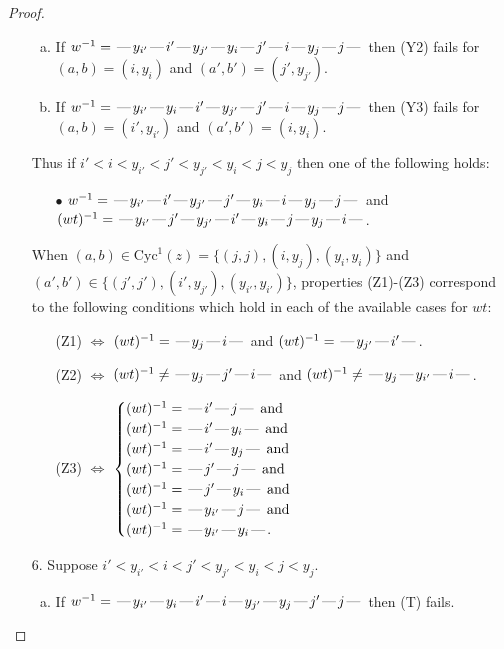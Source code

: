 \documentclass[10pt]{article}
\theoremstyle{definition}
\theoremstyle{definition}
\def\dash{\text{\hspace{0.5mm}---\hspace{0.5mm}}}
\def\Cyc{\mathrm{Cyc}}
\begin{document}
\begin{proof}
\begin{enumerate}
\begin{enumerate}[(a)]
\item If $w^{-1} = \dash y_{i'}\dash i'\dash y_{j'}\dash y_i\dash j'\dash i\dash y_j\dash j\dash $ then (Y2) fails for $(a,b)=(i,y_i)$ and $(a',b')=(j',y_{j'})$.
\item If $w^{-1} = \dash y_{i'}\dash y_i\dash i'\dash y_{j'}\dash j'\dash i\dash y_j\dash j\dash $ then (Y3) fails for $(a,b)=(i',y_{i'})$ and $(a',b')=(i,y_i)$.
\end{enumerate}
Thus if $i' < i < y_{i'} < j' < y_{j'} < y_i < j < y_j$ then one of the following holds:
\begin{enumerate}
\item[$\bullet$] $w^{-1} = \dash y_{i'}\dash i'\dash y_{j'}\dash j'\dash y_i\dash i\dash y_j\dash j\dash $ and $(wt)^{-1} = \dash y_{i'}\dash j'\dash y_{j'}\dash i'\dash y_i\dash j\dash y_j\dash i\dash $.
\end{enumerate}
When $(a,b)\in\Cyc^1(z)=\{(j,j),(i,y_j),(y_i,y_i)\}$ and $(a',b')\in\{(j',j'),(i',y_{j'}),(y_{i'},y_{i'})\}$,
properties (Z1)-(Z3) correspond to the following conditions which
hold in each of the available cases for $wt$:
\begin{enumerate}
\item[](Z1) $\Leftrightarrow$ $(wt)^{-1} = \dash y_j \dash i \dash$  and $(wt)^{-1} = \dash y_{j'} \dash i' \dash$.
\item[](Z2) $\Leftrightarrow$ $(wt)^{-1} \neq \dash y_j \dash j' \dash i \dash$  and $(wt)^{-1} \neq \dash y_j \dash y_{i'} \dash i \dash$.
\item[](Z3) $\Leftrightarrow$ $\begin{cases}\text{$(wt)^{-1} = \dash i' \dash j \dash$}\text{ and }\\
\text{$(wt)^{-1} = \dash i' \dash y_i \dash$}\text{ and }\\
\text{$(wt)^{-1} = \dash i' \dash y_j \dash$}\text{ and }\\
\text{$(wt)^{-1} = \dash j' \dash j \dash$}\text{ and }\\
\text{$(wt)^{-1} = \dash j' \dash y_i \dash$}\text{ and }\\
\text{$(wt)^{-1} = \dash y_{i'} \dash j \dash$}\text{ and }\\
\text{$(wt)^{-1} = \dash y_{i'} \dash y_i \dash$}.\end{cases}$
\end{enumerate}
\item[$6$.] Suppose $i' < y_{i'} < i < j' < y_{j'} < y_i < j < y_j$.
\begin{enumerate}[(a)]
\item If $w^{-1} = \dash y_{i'}\dash y_i\dash i'\dash i\dash y_{j'}\dash y_j\dash j'\dash j\dash $ then (T) fails.

\end{enumerate}
\end{enumerate}
\end{proof}
\end{document}
